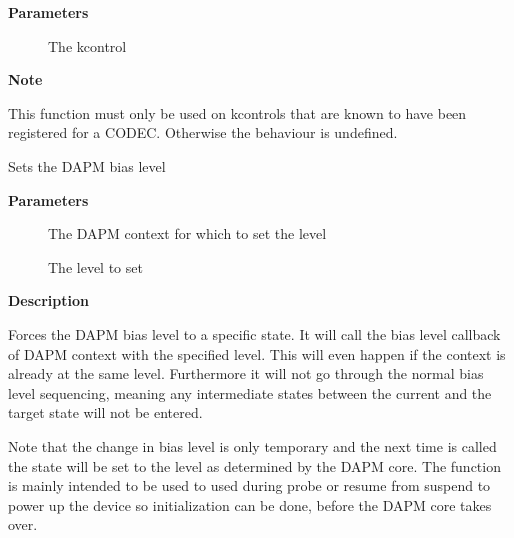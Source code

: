 \documentclass[a4paper,8pt,english]{sphinxmanual}
\begin{document}
\textbf{Parameters}
\begin{description}
\item[{}] \leavevmode
The kcontrol

\end{description}

\textbf{Note}

This function must only be used on kcontrols that are known to have
been registered for a CODEC. Otherwise the behaviour is undefined.

\begin{fulllineitems}
\label{sound/kernel-api/alsa-driver-api:c.snd_soc_dapm_force_bias_level}
Sets the DAPM bias level

\end{fulllineitems}


\textbf{Parameters}
\begin{description}
\item[{}] \leavevmode
The DAPM context for which to set the level

\item[{}] \leavevmode
The level to set

\end{description}

\textbf{Description}

Forces the DAPM bias level to a specific state. It will call the bias level
callback of DAPM context with the specified level. This will even happen if
the context is already at the same level. Furthermore it will not go through
the normal bias level sequencing, meaning any intermediate states between the
current and the target state will not be entered.

Note that the change in bias level is only temporary and the next time
{\hyperref[sound/kernel\string-api/alsa\string-driver\string-api:c.snd_soc_dapm_sync]{\emph{}}} is called the state will be set to the level as
determined by the DAPM core. The function is mainly intended to be used to
used during probe or resume from suspend to power up the device so
initialization can be done, before the DAPM core takes over.
\end{document}
